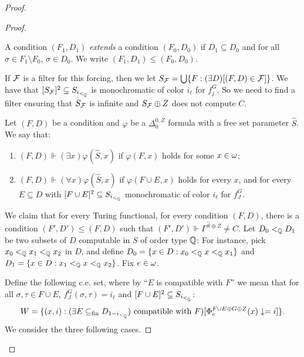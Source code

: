 \begin{proof}
\begin{proof}
\begin{definition}
      A condition $(F_1,D_1)$ \emph{extends} a condition $(F_0,D_0)$ if $D_1\subseteq D_0$ and for all $\sigma\in F_1\setminus F_0$, $\sigma\in D_0$.  We write $(F_1,D_1)\leq(F_0, D_0)$.
    \end{definition}
    If $\mathcal{F}$ is a filter for this forcing, then we let $S_{\mathcal{F}}=\bigcup\{ F: (\exists D)[(F,D)\in\mathcal{F}]\}$. We have that $[S_{\mathcal{F}}]^2\subseteq S_{i_{<_{\mathbb{Q}}}}$ is monochromatic of color $i_\ell$ for $f_j^G$. So we need to find a filter ensuring that $S_{\mathcal{F}}$ is infinite and $S_{\mathcal{F}}\oplus Z$ does not compute $C$.
    \begin{definition}
      Let $(F,D)$ be a condition and $\varphi$ be a $\Delta^{0,Z}_0$ formula with a free set parameter $\hat S$. We say that:
      \begin{enumerate}
      \item $(F,D)\Vdash (\exists x)\varphi(\hat S, x)$ if $\varphi(F,x)$ holds for some $x\in\omega$; 
      \item $(F,D)\Vdash (\forall x)\varphi(\hat S, x)$ if $\varphi(F\cup E,x)$ holds for every $x$, and for every $E\subseteq D$ with $[F\cup E]^2\subseteq S_{i_{<_{\mathbb{Q}}}}$ monochromatic of color $i_\ell$ for $f_J^G$. 
      \end{enumerate}
    \end{definition}
    
    We claim that for every Turing functional, for every condition $(F, D)$, there is a condition $(F',D')\leq(F,D)$ such that $(F',D')\Vdash\Gamma^{\hat S\oplus Z}\neq C$. Let $D_0<_{\mathbb{Q}} D_1$ be two subsets of $D$ computable in $S$ of order type $\mathbb{Q}$: For instance, pick $x_0<_{\mathbb{Q}} x_1<_{\mathbb{Q}} x_2$ in $D$, and define $D_0=\{x\in D:x_0<_{\mathbb{Q}} x<_{\mathbb{Q}} x_1\}$ and $D_1=\{x\in D:x_1<_{\mathbb{Q}} x<_{\mathbb{Q}} x_2\}$. Fix $e\in\omega$.

    Define the following c.e. set, where by ``$E$ is compatible with $F$'' we mean that for all $\sigma,\tau\in F\cup E$, $f_J^G(\sigma,\tau)=i_\ell$ and $[F\cup E]^2\subseteq S_{{i_{<_{\mathbb{Q}}}}}$: \[W=\{( x,i): (\exists E\subseteq_{\mathrm{fin}} D_{1-{i_{<_{\mathbb{Q}}}}})\text{ compatible with $F$})[\Phi_e^{F\cup E\oplus G\oplus Z}(x)\downarrow=i]\}.\]
    We consider the three following cases.
    

\end{proof}
\end{proof}
